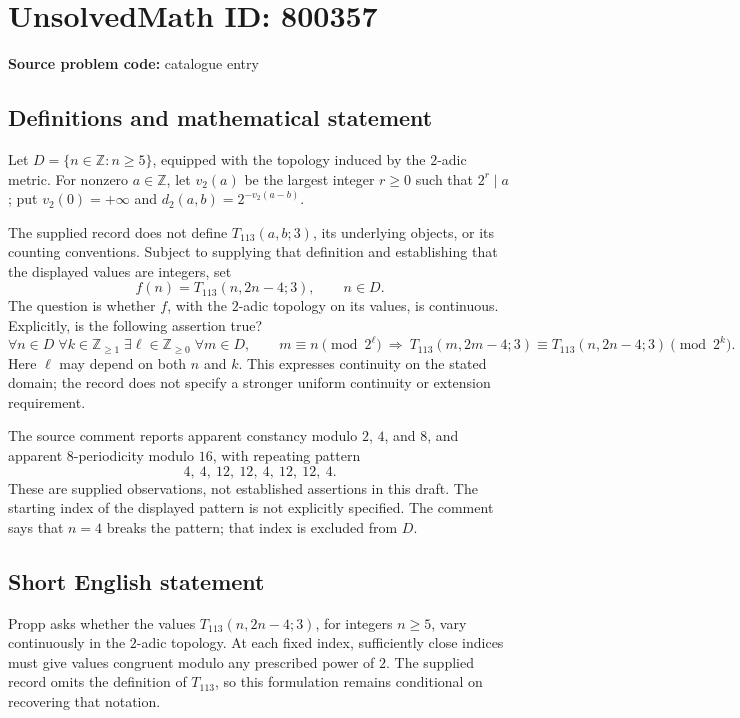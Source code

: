 \documentclass[11pt]{article}
\newcommand{\Z}{\mathbb{Z}}
\begin{document}
\section*{UnsolvedMath ID: 800357}
\textbf{Source problem code:} catalogue entry
\subsection{Definitions and mathematical statement}
Let \(D=\{n\in\Z:n\geq 5\}\), equipped with the topology induced by the \(2\)-adic metric. For nonzero \(a\in\Z\), let \(v_2(a)\) be the largest integer \(r\geq 0\) such that \(2^r\mid a\); put \(v_2(0)=+\infty\) and \(d_2(a,b)=2^{-v_2(a-b)}\).

The supplied record does not define \(T_{113}(a,b;3)\), its underlying objects, or its counting conventions. Subject to supplying that definition and establishing that the displayed values are integers, set
\[
f(n)=T_{113}(n,2n-4;3),\qquad n\in D.
\]
The question is whether \(f\), with the \(2\)-adic topology on its values, is continuous. Explicitly, is the following assertion true?
\[
\forall n\in D\;\forall k\in\Z_{\geq 1}\;\exists \ell\in\Z_{\geq 0}\;\forall m\in D,\qquad
m\equiv n\pmod{2^\ell}
\ \Longrightarrow\
T_{113}(m,2m-4;3)\equiv T_{113}(n,2n-4;3)\pmod{2^k}.
\]
Here \(\ell\) may depend on both \(n\) and \(k\). This expresses continuity on the stated domain; the record does not specify a stronger uniform continuity or extension requirement.

The source comment reports apparent constancy modulo \(2\), \(4\), and \(8\), and apparent \(8\)-periodicity modulo \(16\), with repeating pattern
\[
4,\ 4,\ 12,\ 12,\ 4,\ 12,\ 12,\ 4.
\]
These are supplied observations, not established assertions in this draft. The starting index of the displayed pattern is not explicitly specified. The comment says that \(n=4\) breaks the pattern; that index is excluded from \(D\).
\subsection{Short English statement}
Propp asks whether the values \(T_{113}(n,2n-4;3)\), for integers \(n\geq 5\), vary continuously in the \(2\)-adic topology. At each fixed index, sufficiently close indices must give values congruent modulo any prescribed power of \(2\). The supplied record omits the definition of \(T_{113}\), so this formulation remains conditional on recovering that notation.
\end{document}
